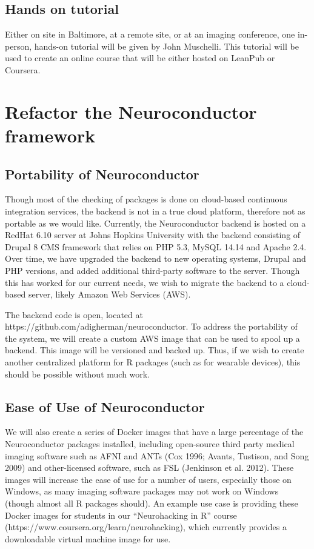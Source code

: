 \documentclass[]{elsarticle} %
\begin{document}
\subsection{Hands on tutorial}\label{hands-on-tutorial}

Either on site in Baltimore, at a remote site, or at an imaging
conference, one in-person, hands-on tutorial will be given by John
Muschelli. This tutorial will be used to create an online course that
will be either hosted on LeanPub or Coursera.

\section{Refactor the Neuroconductor
framework}\label{refactor-the-neuroconductor-framework}

\subsection{Portability of
Neuroconductor}\label{portability-of-neuroconductor}

Though most of the checking of packages is done on cloud-based
continuous integration services, the backend is not in a true cloud
platform, therefore not as portable as we would like. Currently, the
Neuroconductor backend is hosted on a RedHat 6.10 server at Johns
Hopkins University with the backend consisting of Drupal 8 CMS framework
that relies on PHP 5.3, MySQL 14.14 and Apache 2.4. Over time, we have
upgraded the backend to new operating systems, Drupal and PHP versions,
and added additional third-party software to the server. Though this has
worked for our current needs, we wish to migrate the backend to a
cloud-based server, likely Amazon Web Services (AWS).

The backend code is open, located at
https://github.com/adigherman/neuroconductor. To address the portability
of the system, we will create a custom AWS image that can be used to
spool up a backend. This image will be versioned and backed up. Thus, if
we wish to create another centralized platform for R packages (such as
for wearable devices), this should be possible without much work.

\subsection{Ease of Use of
Neuroconductor}\label{ease-of-use-of-neuroconductor}

We will also create a series of Docker images that have a large
percentage of the Neuroconductor packages installed, including
open-source third party medical imaging software such as AFNI and ANTs
(Cox 1996; Avants, Tustison, and Song 2009) and other-licensed software,
such as FSL (Jenkinson et al. 2012). These images will increase the ease
of use for a number of users, especially those on Windows, as many
imaging software packages may not work on Windows (though almost all R
packages should). An example use case is providing these Docker images
for students in our ``Neurohacking in R'' course
(https://www.coursera.org/learn/neurohacking), which currently provides
a downloadable virtual machine image for use.
\end{document}
